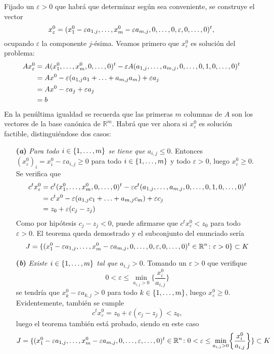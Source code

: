 \documentclass[11pt]{report}
\makeatletter
\renewenvironment{proof}[1][\proofname]{\par
  \pushQED{\qed}%
  \normalfont \topsep\z@skip %
  \trivlist
  \item[\hskip\labelsep
        \itshape
    #1\@addpunct{.}]\ignorespaces
}{%
  \popQED\endtrivlist\@endpefalse
}
\theoremstyle{mytheorem}
\theoremstyle{mydefinition}
\theoremstyle{myexample}
\let\oldproofname=\proofname
\renewcommand{\proofname}{\rm\bf{\oldproofname}}}
\newcommand{\R}{\mathbb R}
\makeatother
\begin{document}
\begin{proof}
Fijado un $\varepsilon > 0$ que habrá que determinar según sea conveniente, se construye el vector \[x_\varepsilon^0 = (x^0_1-\varepsilon a_{1,j},\mathellipsis,x^0_m-\varepsilon a_{m,j},0,\mathellipsis,0,\varepsilon,0,\mathellipsis,0)^t,\] ocupando $\varepsilon$ la componente $j$-ésima. Veamos primero que $x_\varepsilon^0$ es solución del problema:
\[
\begin{aligned}[t]
Ax_\varepsilon^0 &= A(x^0_1,\mathellipsis,x^0_m,0,\mathellipsis,0)^t-\varepsilon A(a_{1,j},\mathellipsis,a_{m,j},0,\mathellipsis,0,1,0,\mathellipsis,0)^t \\
&= Ax^0 - \varepsilon(a_{1,j}a_1+\mathellipsis+a_{m,j}a_m)+\varepsilon a_j \\
&= Ax^0 - \varepsilon a_j+\varepsilon a_j \\
&= b
\end{aligned}
\]
En la penúltima igualdad se recuerda que las primeras $m$ columnas de $A$ son los vectores de la base canónica de $\R^m$. Habrá que ver ahora si $x^0_\varepsilon$ es solución factible, distinguiéndose dos casos:
\begin{itemize}
    \item[\textbf{(\textit{a})}] \textit{Para todo $i \in \{1,\mathellipsis,m\}$ se tiene que $a_{i,j} \leq 0$}. Entonces $(x_\varepsilon^0)_i = x^0_i-\varepsilon a_{i,j} \geq 0$ para todo $i \in \{1,\mathellipsis,m\}$ y todo $\varepsilon > 0$, luego $x_\varepsilon^0 \geq 0$. Se verifica que
\[
\begin{aligned}[t]
c^tx_\varepsilon^0 &= c^t(x^0_1,\mathellipsis,x^0_m,0,\mathellipsis,0)^t-\varepsilon c^t(a_{1,j},\mathellipsis,a_{m,j},0,\mathellipsis,0,1,0,\mathellipsis,0)^t \\
&= c^tx^0 - \varepsilon(a_{1,j}c_1+\mathellipsis+a_{m,j}c_m)+\varepsilon c_j \\
&= z_0 + \varepsilon(c_j-z_j)
\end{aligned}
\]
Como por hipótesis $c_j-z_j<0$, puede afirmarse que $c^tx_\varepsilon^0 < z_0$ para todo $\varepsilon > 0$. El teorema queda demostrado y el subconjunto del enunciado sería
\[J = \{(x^0_1-\varepsilon a_{1,j},\mathellipsis,x^0_m-\varepsilon a_{m,j},0,\mathellipsis,0,\varepsilon,0,\mathellipsis,0)^t \in \R^n \colon \varepsilon > 0\} \subset K\]
    \item[\textbf{(\textit{b})}] \textit{Existe $i \in \{1,\mathellipsis,m\}$ tal que $a_{i,j} > 0$}. Tomando un $\varepsilon > 0$ que verifique
    \[0 < \varepsilon \leq \min_{a_{i,j} > 0} \biggl\{\frac{x_i^0}{a_{i,j}} \biggr\}\]
    se tendría que $x_k^0 -\varepsilon a_{k,j}> 0$ para todo $k \in \{1,\mathellipsis,m\}$, luego $x_\varepsilon^0 \geq 0$. Evidentemente, también se cumple
\[
c^tx_\varepsilon^0 = z_0 + \varepsilon(c_j-z_j) < z_0,
\]
luego el teorema también está probado, siendo en este caso
\[J = \{(x^0_1-\varepsilon a_{1,j},\mathellipsis,x^0_m-\varepsilon a_{m,j},0,\mathellipsis,\varepsilon,\mathellipsis,0)^t \in \R^n \colon 0 < \varepsilon \leq \min_{a_{i,j} > 0} \biggl\{\frac{x_i^0}{a_{i,j}} \biggr\} \} \subset K\]
\end{itemize}


\end{proof}
\end{document}
